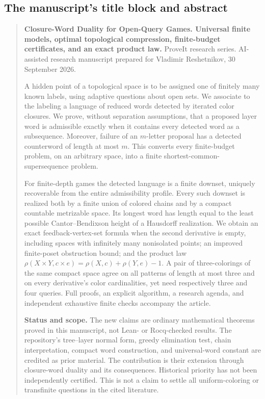 \documentclass[11pt,letterpaper]{article}
\numberwithin{equation}{section}
\theoremstyle{definition}
\theoremstyle{remark}
\theoremstyle{definition}
\begin{document}
\subsection{The manuscript's title block and abstract}
\label{cw:sec:abstract}
\begin{quote}\small
\textbf{Closure-Word Duality for Open-Query Games. Universal finite models,
optimal topological compression, finite-budget certificates, and an exact
product law.} ProveIt research series. AI-assisted research manuscript
prepared for Vladimir Reshetnikov, 30 September 2026.

A hidden point of a topological space is to be assigned one of finitely many
known labels, using adaptive questions about open sets. We associate to the
labeling a language of reduced words detected by iterated color closures.
We prove, without separation assumptions, that a proposed layer word is
admissible exactly when it contains every detected word as a subsequence.
Moreover, failure of an $m$-letter proposal has a detected counterword of
length at most $m$. This converts every finite-budget problem, on an arbitrary
space, into a finite shortest-common-supersequence problem.

For finite-depth games the detected language is a finite downset, uniquely
recoverable from the entire admissibility profile. Every such downset is
realized both by a finite union of colored chains and by a compact countable
metrizable space. Its longest word has length equal to the least possible
Cantor--Bendixson height of a Hausdorff realization. We obtain an exact
feedback-vertex-set formula when the second derivative is empty, including
spaces with infinitely many nonisolated points; an improved finite-poset
obstruction bound; and the product law
$\rho(X\times Y,c\times e)=\rho(X,c)+\rho(Y,e)-1$.
A pair of three-colorings of the same compact space agree on all patterns
of length at most three and on every derivative's color cardinalities, yet
need respectively three and four queries. Full proofs, an explicit algorithm,
a research agenda, and independent exhaustive finite checks accompany the
article.

\textbf{Status and scope.}
The new claims are ordinary mathematical theorems proved in this manuscript,
not Lean- or Rocq-checked results. The repository's tree--layer normal form,
greedy elimination test, chain interpretation, compact word construction,
and universal-word constant are credited as prior material. The contribution
is their extension through closure-word duality and its consequences.
Historical priority has not been independently certified. This is not a claim
to settle all uniform-coloring or transfinite questions in the cited
literature.
\end{quote}
\end{document}
